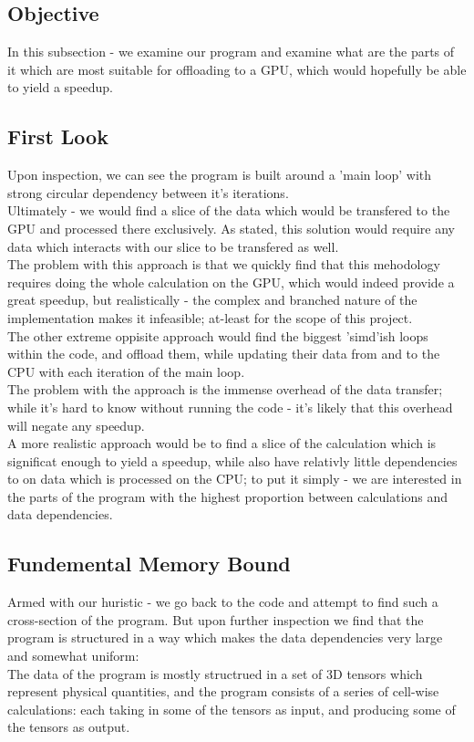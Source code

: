 \subsection*{Objective}
In this subsection - we examine our program and examine
what are the parts of it which are most suitable for offloading to a GPU,
which would hopefully be able to yield a speedup.

\subsection*{First Look}
Upon inspection,
we can see the program is built around a 'main loop'
with strong circular dependency between it's iterations.\\
Ultimately - we would find a slice of the data
which would be transfered to the GPU and processed there exclusively.
As stated, this solution would require any data
which interacts with our slice to be transfered as well.\\

The problem with this approach is that we quickly find that
this mehodology requires doing the whole calculation on the GPU,
which would indeed provide a great speedup,
but realistically - the complex and branched nature
of the implementation makes it infeasible; at-least
for the scope of this project.\\

The other extreme oppisite approach would 
find the biggest 'simd'ish loops within the code,
and offload them, while updating their data from and to the CPU
with each iteration of the main loop.\\
The problem with the approach is the immense overhead
of the data transfer; while it's hard to know without
running the code - it's likely that
this overhead will negate any speedup.\\

A more realistic approach would be to find a slice of
the calculation which is significat enough to yield
a speedup, while also have relativly little dependencies
to on data which is processed on the CPU;
to put it simply - we are interested in the
parts of the program with the highest proportion
between calculations and data dependencies.\\

\subsection*{Fundemental Memory Bound}
Armed with our huristic - we go back to the code and attempt
to find such a cross-section of the program.
But upon further inspection we find that the program
is structured in a way which makes the data dependencies
very large and somewhat uniform:\\
The data of the program is mostly structrued
in a set of 3D tensors which represent physical quantities,
and the program consists of a series of cell-wise calculations:
each taking in some of the tensors as input, 
and producing some of the tensors as output.\\

